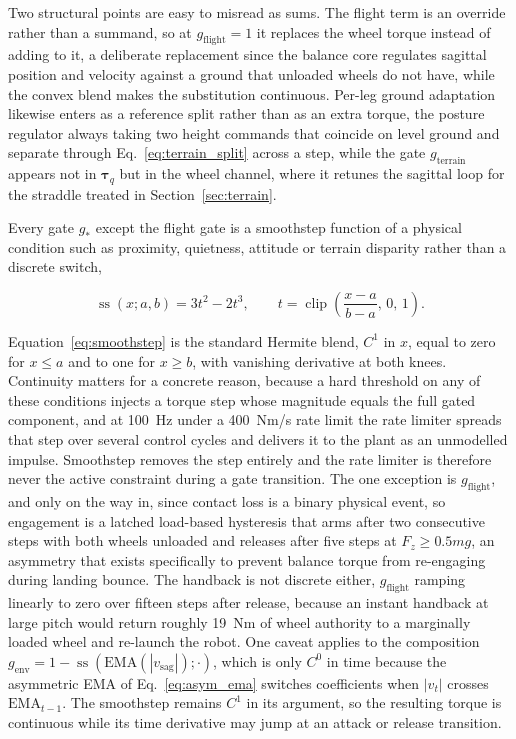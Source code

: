 \documentclass[a4paper,fleqn]{cas-dc}
\begin{document}
Two structural points are easy to misread as sums. The flight term is an override
rather than a summand, so at $g_{\text{flight}}{=}1$ it replaces the wheel torque
instead of adding to it, a deliberate replacement since the balance core
regulates sagittal position and velocity against a ground that unloaded wheels do
not have, while the convex blend makes the substitution continuous. Per-leg
ground adaptation likewise enters as a reference split rather than as an extra
torque, the posture regulator always taking two height commands that coincide on
level ground and separate through Eq.~\eqref{eq:terrain_split} across a step,
while the gate $g_{\text{terrain}}$ appears not in $\boldsymbol{\tau}_q$ but in
the wheel channel, where it retunes the sagittal loop for the straddle treated in
Section~\ref{sec:terrain}.

Every gate $g_*$ except the flight gate is a smoothstep function of a physical
condition such as proximity, quietness, attitude or terrain disparity rather
than a discrete switch,

\begin{equation}
\operatorname{ss}(x;a,b) = 3t^2 - 2t^3,
\qquad t = \operatorname{clip}\!\left(\frac{x-a}{b-a},\,0,\,1\right).
\label{eq:smoothstep}
\end{equation}

Equation~\eqref{eq:smoothstep} is the standard Hermite blend, $C^1$ in $x$, equal
to zero for $x\leq a$ and to one for $x\geq b$, with vanishing derivative at both
knees. Continuity matters for a concrete reason, because a hard threshold on any
of these conditions injects a torque step whose magnitude equals the full gated
component, and at \SI{100}{Hz} under a \SI{400}{Nm/s} rate limit the rate limiter
spreads that step over several control cycles and delivers it to the plant as an
unmodelled impulse. Smoothstep removes the step entirely and the rate limiter is
therefore never the active constraint during a gate transition. The one exception
is $g_{\text{flight}}$, and only on the way in, since contact loss is a binary
physical event, so engagement is a latched load-based hysteresis that arms after
two consecutive steps with both wheels unloaded and releases after five steps at
$F_z \geq 0.5mg$, an asymmetry that exists specifically to prevent balance torque
from re-engaging during landing bounce. The handback is not discrete either,
$g_{\text{flight}}$ ramping linearly to zero over fifteen steps after release,
because an instant handback at large pitch would return roughly \SI{19}{Nm} of
wheel authority to a marginally loaded wheel and re-launch the robot. One caveat
applies to the composition
$g_{\text{env}} = 1 - \operatorname{ss}(\mathrm{EMA}(|v_{\text{sag}}|);\cdot)$,
which is only $C^0$ in time because the asymmetric EMA of
Eq.~\eqref{eq:asym_ema} switches coefficients when $|v_t|$ crosses
$\mathrm{EMA}_{t-1}$. The smoothstep remains $C^1$ in its argument, so the
resulting torque is continuous while its time derivative may jump at an attack
or release transition.
\end{document}
